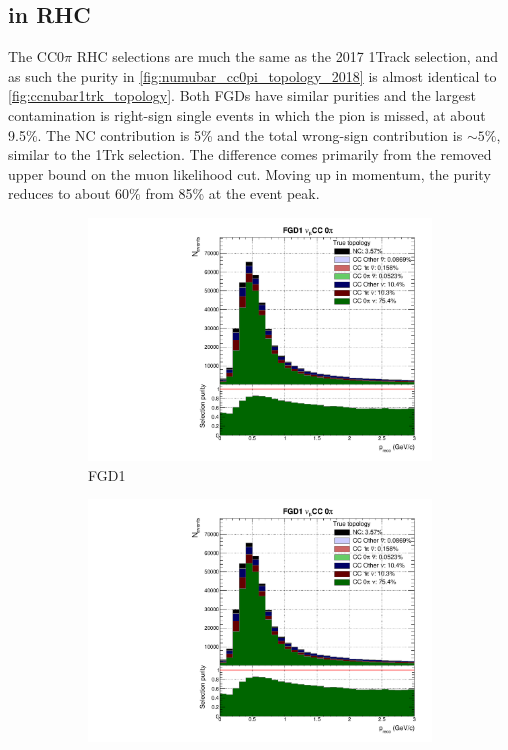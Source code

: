 \subsection{\numubar in RHC}
The CC0$\pi$ RHC selections are much the same as the 2017 1Track selection, and as such the purity in \autoref{fig:numubar_cc0pi_topology_2018} is almost identical to \autoref{fig:ccnubar1trk_topology}. Both FGDs have similar purities and the largest contamination is right-sign single events in which the pion is missed, at about 9.5\%. The NC contribution is 5\% and the total wrong-sign contribution is $\sim5\%$, similar to the 1Trk selection. The difference comes primarily from the removed upper bound on the muon likelihood cut. Moving up in momentum, the purity reduces to about 60\% from 85\% at the event peak.
\begin{figure}[h]
	\begin{subfigure}[t]{0.49\textwidth}
		\includegraphics[width=\textwidth,page=13, trim={0mm 0mm 0mm 9mm}, clip]{figures/mach3/2018/Selection/2018_RedNDmatrix_rebin_verbose_may_noweights_diagnostics}
		\caption{FGD1}
	\end{subfigure}
	\begin{subfigure}[t]{0.49\textwidth}
		\includegraphics[width=\textwidth,page=19, trim={0mm 0mm 0mm 9mm}, clip]{figures/mach3/2018/Selection/2018_RedNDmatrix_rebin_verbose_may_noweights_diagnostics}

\end{subfigure}
\end{figure}
